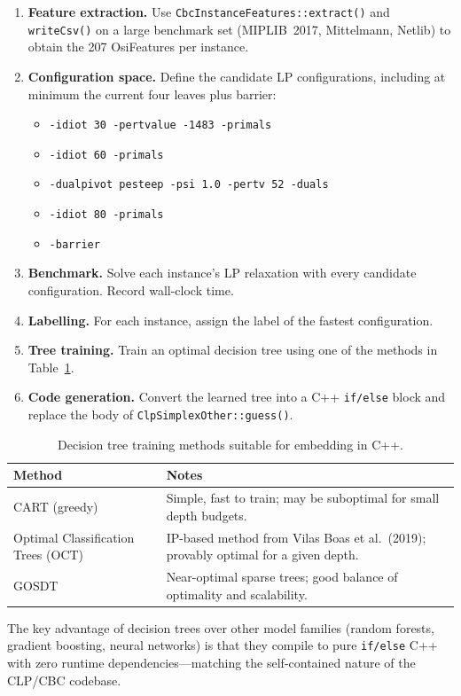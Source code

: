 \documentclass[11pt,a4paper]{article}
\begin{document}
\begin{enumerate}
  \item \textbf{Feature extraction.}  Use
        \texttt{CbcInstanceFeatures::extract()} and
        \texttt{writeCsv()} on a large benchmark set (MIPLIB~2017,
        Mittelmann, Netlib) to obtain the 207 OsiFeatures per instance.
  \item \textbf{Configuration space.}  Define the candidate LP
        configurations, including at minimum the current four leaves plus
        barrier:
        \begin{itemize}
          \item \texttt{-idiot 30 -pertvalue -1483 -primals}
          \item \texttt{-idiot 60 -primals}
          \item \texttt{-dualpivot pesteep -psi 1.0 -pertv 52 -duals}
          \item \texttt{-idiot 80 -primals}
          \item \texttt{-barrier}
        \end{itemize}
  \item \textbf{Benchmark.}  Solve each instance's LP relaxation with
        every candidate configuration.  Record wall-clock time.
  \item \textbf{Labelling.}  For each instance, assign the label of the
        fastest configuration.
  \item \textbf{Tree training.}  Train an optimal decision tree using one
        of the methods in Table~\ref{tab:tree-methods}.
  \item \textbf{Code generation.}  Convert the learned tree into a C++
        \texttt{if/else} block and replace the body of
        \texttt{ClpSimplexOther::guess()}.
\end{enumerate}

\begin{table}[htbp]
\centering
\caption{Decision tree training methods suitable for embedding in C++.}
\label{tab:tree-methods}
\begin{tabular}{@{}lp{9cm}@{}}
\toprule
\textbf{Method} & \textbf{Notes} \\
\midrule
CART (greedy) & Simple, fast to train; may be suboptimal for small depth budgets. \\
Optimal Classification Trees (OCT) & IP-based method from Vilas Boas et al.\ (2019); provably optimal for a given depth. \\
GOSDT & Near-optimal sparse trees; good balance of optimality and scalability. \\
\bottomrule
\end{tabular}
\end{table}

The key advantage of decision trees over other model families (random
forests, gradient boosting, neural networks) is that they compile to pure
\texttt{if/else} C++ with zero runtime dependencies---matching the
self-contained nature of the CLP/CBC codebase.
\end{document}
